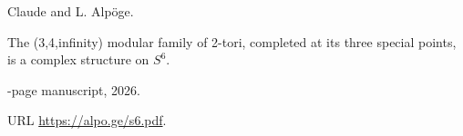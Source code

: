 {Claude} and {L. Alp{\"o}ge}.

\newblock The (3,4,infinity) modular family of 2-tori, completed at its three
  special points, is a complex structure on {$S^6$}.

-page manuscript, 2026.

\newblock URL \url{https://alpo.ge/s6.pdf}.

